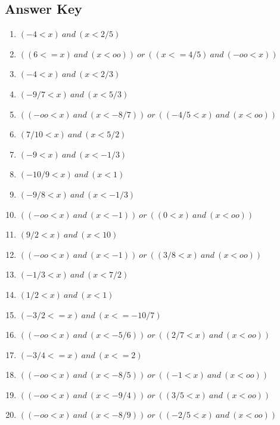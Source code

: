 \documentclass{article}
\begin{document}
\newpage

\subsection*{Answer Key}

\begin{enumerate}
\item $\displaystyle (-4 < x) \ and \  (x < 2/5) $ \ 
\item $\displaystyle ((6 <= x) \ and \  (x < oo)) \ or \  ((x <= 4/5) \ and \  (-oo < x)) $ \ 
\item $\displaystyle (-4 < x) \ and \  (x < 2/3) $ \ 
\item $\displaystyle (-9/7 < x) \ and \  (x < 5/3) $ \ 
\item $\displaystyle ((-oo < x) \ and \  (x < -8/7)) \ or \  ((-4/5 < x) \ and \  (x < oo)) $ \ 
\item $\displaystyle (7/10 < x) \ and \  (x < 5/2) $ \ 
\item $\displaystyle (-9 < x) \ and \  (x < -1/3) $ \ 
\item $\displaystyle (-10/9 < x) \ and \  (x < 1) $ \ 
\item $\displaystyle (-9/8 < x) \ and \  (x < -1/3) $ \ 
\item $\displaystyle ((-oo < x) \ and \  (x < -1)) \ or \  ((0 < x) \ and \  (x < oo)) $ \ 
\item $\displaystyle (9/2 < x) \ and \  (x < 10) $ \ 
\item $\displaystyle ((-oo < x) \ and \  (x < -1)) \ or \  ((3/8 < x) \ and \  (x < oo)) $ \ 
\item $\displaystyle (-1/3 < x) \ and \  (x < 7/2) $ \ 
\item $\displaystyle (1/2 < x) \ and \  (x < 1) $ \ 
\item $\displaystyle (-3/2 <= x) \ and \  (x <= -10/7) $ \ 
\item $\displaystyle ((-oo < x) \ and \  (x < -5/6)) \ or \  ((2/7 < x) \ and \  (x < oo)) $ \ 
\item $\displaystyle (-3/4 <= x) \ and \  (x <= 2) $ \ 
\item $\displaystyle ((-oo < x) \ and \  (x < -8/5)) \ or \  ((-1 < x) \ and \  (x < oo)) $ \ 
\item $\displaystyle ((-oo < x) \ and \  (x < -9/4)) \ or \  ((3/5 < x) \ and \  (x < oo)) $ \ 
\item $\displaystyle ((-oo < x) \ and \  (x < -8/9)) \ or \  ((-2/5 < x) \ and \  (x < oo)) $ \ 

\end{enumerate}
\end{document}
